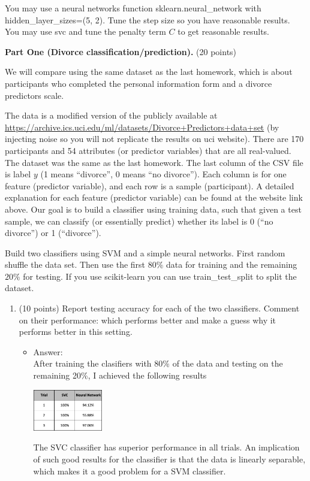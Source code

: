 \documentclass[twoside,10pt]{article}
\begin{document}
\begin{enumerate}
You may use a neural networks function \textsf{sklearn.neural\_network} with \textsf{hidden\_layer\_sizes=(5, 2)}. Tune the step size so you have reasonable results. You may use \textsf{svc} and tune the penalty term $C$ to get reasonable results. 

\textbf{Part One (Divorce classification/prediction).} (20 points) 

We will compare using the same dataset as the last homework, which is about participants who completed the personal information form and a divorce predictors scale. 

The data is a modified version of the publicly available at \url{https://archive.ics.uci.edu/ml/datasets/Divorce+Predictors+data+set} (by injecting noise so you will not replicate the results on uci website). There are 170 participants and 54 attributes (or predictor variables) that are all real-valued. The dataset was the same as the last homework. The last column of the CSV file is label $y$ (1 means ``divorce'', 0 means ``no divorce''). Each column is for one feature (predictor variable), and each row is a sample (participant). A detailed explanation for each feature (predictor variable) can be found at the website link above. Our goal is to build a classifier using training data, such that given a test sample, we can classify (or essentially predict) whether its label is 0 (``no divorce'') or 1 (``divorce''). 

Build two classifiers using SVM and a simple neural networks. First random shuffle the data set. Then use the first $80\%$ data for training and the remaining $20\%$ for testing. If you use \textsf{scikit-learn} you can use \textsf{train\_test\_split} to split the dataset. 

\begin{enumerate}

	\item (10 points) Report testing accuracy for each of the two classifiers.  Comment on their performance: which performs better and make a guess why it performs better in this setting. 
	
	\begin{itemize}
	\item Answer:\\
	After training the clasifiers with 80\% of the data and testing on the remaining 20\%, I achieved the following results
	\begin{center}
\includegraphics[width = 0.25\textwidth]{Q4a.png}
\end{center}
The SVC classifier has superior performance in all trials. An implication of such good results for the classifier is that the data is linearly separable, which makes it a good problem for a SVM classifier.



\end{itemize}
\end{enumerate}
\end{enumerate}
\end{document}
